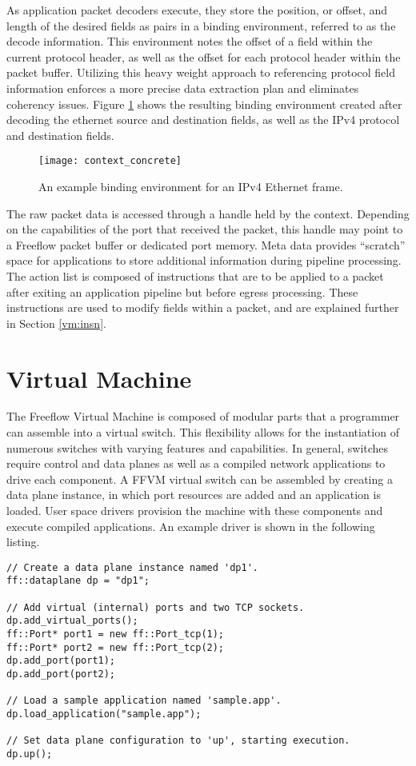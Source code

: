 As application packet decoders execute, they store the position, or offset, and
length of the desired fields as pairs in a binding environment, referred to as
the decode information. This environment notes the offset of a field within the
current protocol header, as well as the offset for each protocol header within
the packet buffer. Utilizing this heavy weight approach to referencing protocol
field information enforces a more precise data extraction plan and eliminates
coherency issues. Figure \ref{context_binding} shows the resulting binding
environment created after decoding the ethernet source and destination fields,
as well as the IPv4 protocol and destination fields.

\begin{figure}[h!]
\centering
\texttt{[image: context\_concrete]}
\caption{An example binding environment for an IPv4 Ethernet frame.}
\label{context_binding}
\end{figure}

The raw packet data is accessed through a handle held by the context. Depending
on the capabilities of the port that received the packet, this handle may point
to a Freeflow packet buffer or dedicated port memory. Meta data provides
``scratch'' space for applications to store additional information during
pipeline processing. The action list is composed of instructions that are to
be applied to a packet after exiting an application pipeline but before egress
processing. These instructions are used to modify fields within a packet, and
are explained further in Section \ref{vm:insn}.

\section{Virtual Machine}
\label{vm}
The Freeflow Virtual Machine is composed of modular parts that a programmer can
assemble into a virtual switch. This flexibility allows for the instantiation
of numerous switches with varying features and capabilities. In general,
switches require control and data planes as well as a compiled network
applications to drive each component. A FFVM virtual switch can be assembled
by creating a data plane instance, in which port resources are added and an
application is loaded. User space drivers provision the machine with these
components and execute compiled applications. An example driver is shown in the
following listing.

\begin{lstlisting}
// Create a data plane instance named 'dp1'.
ff::dataplane dp = "dp1";

// Add virtual (internal) ports and two TCP sockets.
dp.add_virtual_ports();
ff::Port* port1 = new ff::Port_tcp(1);
ff::Port* port2 = new ff::Port_tcp(2);
dp.add_port(port1);
dp.add_port(port2);

// Load a sample application named 'sample.app'.
dp.load_application("sample.app");

// Set data plane configuration to 'up', starting execution.
dp.up();
\end{lstlisting}


